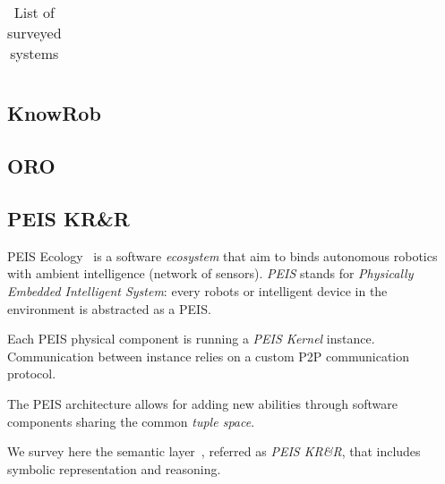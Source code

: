 \documentclass[a4paper]{article}
\begin{document}
\begin{landscape}
\begin{table}
\begin{center}
\begin{tabular}{p{2.7cm}p{4cm}lp{2.5cm}p{4cm}lp{1.5cm}}
\hline

\end{tabular}
\end{center}
\caption{List of surveyed systems}
\label{table|surveyed-systems}
\end{table}
\end{landscape}

\subsection{KnowRob}
\label{sect|knowrob}

\subsection{ORO}
\label{sect|oro}

\subsection{PEIS KR\&R}
\label{sect|peis-ecology}


{\sc PEIS Ecology}~\cite{Saffiotti2005} is a software \emph{ecosystem} that aim to binds autonomous
robotics with ambient intelligence (network of sensors). \emph{PEIS} stands for
\emph{Physically Embedded Intelligent System}: every robots or intelligent
device in the environment is abstracted as a PEIS.

Each PEIS physical component is running a \emph{PEIS Kernel} instance. Communication
between instance relies on a custom P2P communication protocol.

The PEIS architecture allows for adding new abilities through software components sharing the common \emph{tuple space}.

We survey here the semantic layer~\cite{Daoutis2009}, referred as \emph{PEIS KR\&R}, that includes symbolic representation and reasoning.

\end{document}
